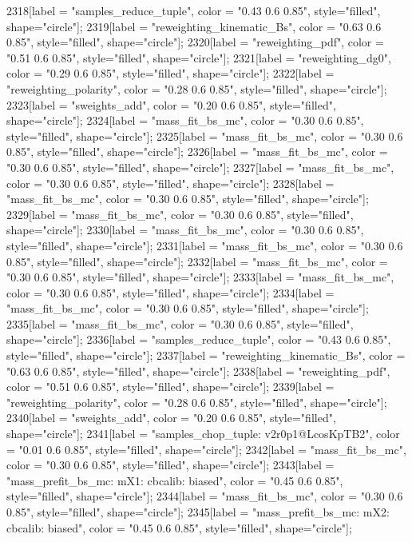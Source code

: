{	2318[label = "samples_reduce_tuple", color = "0.43 0.6 0.85", style="filled", shape="circle"];
	2319[label = "reweighting_kinematic_Bs", color = "0.63 0.6 0.85", style="filled", shape="circle"];
	2320[label = "reweighting_pdf", color = "0.51 0.6 0.85", style="filled", shape="circle"];
	2321[label = "reweighting_dg0", color = "0.29 0.6 0.85", style="filled", shape="circle"];
	2322[label = "reweighting_polarity", color = "0.28 0.6 0.85", style="filled", shape="circle"];
	2323[label = "sweights_add", color = "0.20 0.6 0.85", style="filled", shape="circle"];
	2324[label = "mass_fit_bs_mc", color = "0.30 0.6 0.85", style="filled", shape="circle"];
	2325[label = "mass_fit_bs_mc", color = "0.30 0.6 0.85", style="filled", shape="circle"];
	2326[label = "mass_fit_bs_mc", color = "0.30 0.6 0.85", style="filled", shape="circle"];
	2327[label = "mass_fit_bs_mc", color = "0.30 0.6 0.85", style="filled", shape="circle"];
	2328[label = "mass_fit_bs_mc", color = "0.30 0.6 0.85", style="filled", shape="circle"];
	2329[label = "mass_fit_bs_mc", color = "0.30 0.6 0.85", style="filled", shape="circle"];
	2330[label = "mass_fit_bs_mc", color = "0.30 0.6 0.85", style="filled", shape="circle"];
	2331[label = "mass_fit_bs_mc", color = "0.30 0.6 0.85", style="filled", shape="circle"];
	2332[label = "mass_fit_bs_mc", color = "0.30 0.6 0.85", style="filled", shape="circle"];
	2333[label = "mass_fit_bs_mc", color = "0.30 0.6 0.85", style="filled", shape="circle"];
	2334[label = "mass_fit_bs_mc", color = "0.30 0.6 0.85", style="filled", shape="circle"];
	2335[label = "mass_fit_bs_mc", color = "0.30 0.6 0.85", style="filled", shape="circle"];
	2336[label = "samples_reduce_tuple", color = "0.43 0.6 0.85", style="filled", shape="circle"];
	2337[label = "reweighting_kinematic_Bs", color = "0.63 0.6 0.85", style="filled", shape="circle"];
	2338[label = "reweighting_pdf", color = "0.51 0.6 0.85", style="filled", shape="circle"];
	2339[label = "reweighting_polarity", color = "0.28 0.6 0.85", style="filled", shape="circle"];
	2340[label = "sweights_add", color = "0.20 0.6 0.85", style="filled", shape="circle"];
	2341[label = "samples_chop_tuple\nversion: v2r0p1@LcosKpTB2", color = "0.01 0.6 0.85", style="filled", shape="circle"];
	2342[label = "mass_fit_bs_mc", color = "0.30 0.6 0.85", style="filled", shape="circle"];
	2343[label = "mass_prefit_bs_mc\nmassbin: mX1\nmassmodel: cbcalib\ntrigger: biased", color = "0.45 0.6 0.85", style="filled", shape="circle"];
	2344[label = "mass_fit_bs_mc", color = "0.30 0.6 0.85", style="filled", shape="circle"];
	2345[label = "mass_prefit_bs_mc\nmassbin: mX2\nmassmodel: cbcalib\ntrigger: biased", color = "0.45 0.6 0.85", style="filled", shape="circle"];
}
